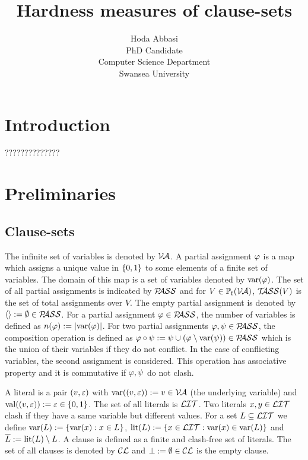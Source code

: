 \documentclass[]{book}
\begin{document}
\title{Hardness measures of clause-sets}

\author{Hoda Abbasi\\
        PhD Candidate\\
        Computer Science Department\\
        Swansea University\\}
\maketitle

\tableofcontents
\chapter{Introduction}
\label{cha:Introduction}

??????????????
\chapter{Preliminaries}
\label{cha:Preliminaries}

\section{Clause-sets}
\label{sec:Clause-sets}

The infinite set of variables is denoted by $\mathcal{V\hspace{-0.1em}A}$. A partial assignment $\varphi$ is a map which assigns a unique value in $\{ 0,1 \}$ to some elements of a finite set of variables. The domain of this map is a set of variables denoted by $\operatorname{var}(\varphi)$. The set of all partial assignments is indicated by $\mathcal{P\hspace{-0.32em}ASS}$ and for $V \in \operatorname{\mathbb{P}_f}(\mathcal{V\hspace{-0.1em}A})$, $\mathcal{T\hspace{-0.35em}ASS}(V)$ is the set of total assignments over $V$. The empty partial assignment is denoted by $\langle  \rangle:= \emptyset \in \mathcal{P\hspace{-0.32em}ASS}$. For a partial assignment $\varphi \in \mathcal{P\hspace{-0.32em}ASS}$, the number of variables is defined as $n(\varphi):=\lvert \operatorname{var}(\varphi) \rvert$. For two partial assignments $\varphi, \psi \in \mathcal{P\hspace{-0.32em}ASS}$, the composition operation is defined as $\varphi \circ \psi := \psi \cup (\varphi \setminus \operatorname{var}(\psi)) \in \mathcal{P\hspace{-0.32em}ASS}$ which is the union of their variables if they do not conflict. In the case of conflicting variables, the second assignment is considered. This operation has associative property and it is commutative if $\varphi, \psi$ do not clash.

A literal is a pair $(v,\varepsilon)$ with $\operatorname{var}((v,\varepsilon)):=v \in \mathcal{V\hspace{-0.1em}A}$ (the underlying variable) and $\operatorname{val}((v,\varepsilon)):=\varepsilon \in \{ 0,1 \}$. The set of all literals is $\mathcal{LIT}$. Two literals $x, y \in \mathcal{LIT}$ clash if they have a same variable but different values. For a set $L \subseteq \mathcal{LIT}$ we define $\operatorname{var}(L) := \{ \operatorname{var}(x) : x \in L \}$, $\operatorname{lit}(L):= \{ x \in \mathcal{LIT} : \operatorname{var}(x) \in \operatorname{var}(L) \}$ and $\overline{L} := \operatorname{lit}(L) \setminus L$. A clause is defined as a finite and clash-free set of literals. The set of all clauses is denoted by $\mathcal{CL}$ and $\bot := \emptyset \in \mathcal{CL}$ is the empty clause. 
\end{document}
